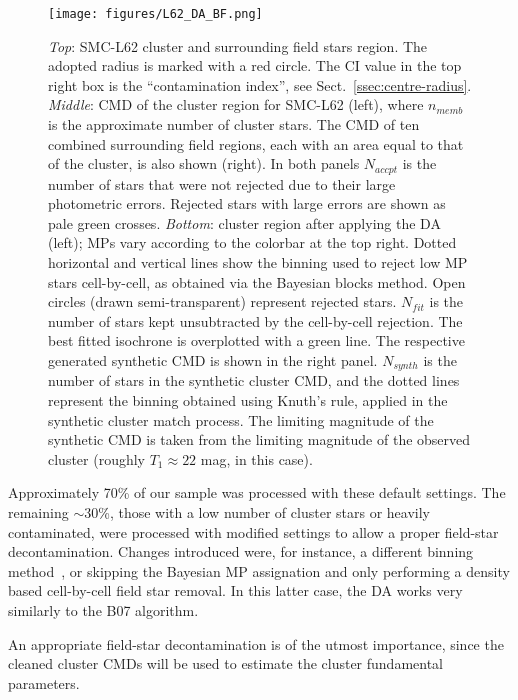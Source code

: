 \documentclass{aa}
\begin{document}
\begin{figure}
\centering
\texttt{[image: figures/L62\_DA\_BF.png]}
\caption{\emph{Top}: SMC-L62 cluster and surrounding field stars
region. The adopted radius is marked with a red circle. The CI value in the top
right box is the ``contamination index'', see Sect.~\ref{ssec:centre-radius}.
%
\emph{Middle}: CMD of the cluster region for SMC-L62 (left),
where $n_{memb}$ is the approximate number of cluster stars. The CMD
of ten combined surrounding field regions, each with an area equal to
that of the cluster, is also shown (right).
In both panels $N_{accpt}$ is the number of stars that were not rejected due to
their large photometric errors. Rejected stars with large errors are shown as
pale green crosses.
%
\emph{Bottom}: cluster region after applying the DA (left); MPs vary
according to the colorbar at the top right. Dotted horizontal and vertical lines
show the binning used to reject low MP stars cell-by-cell, as obtained via the
Bayesian blocks method. Open circles (drawn semi-transparent) represent rejected
stars.
$N_{fit}$ is the number of stars kept unsubtracted by the cell-by-cell
rejection. The best fitted isochrone is overplotted with a green line. 
The respective generated synthetic CMD is shown in the right panel. $N_{synth}$
is the number of stars in the synthetic cluster CMD, and the dotted lines
represent the binning obtained using Knuth's rule, applied in the synthetic
cluster match process. The limiting magnitude of the synthetic CMD is
taken from the limiting magnitude of the observed cluster (roughly
$T_1{\approx}22$ mag, in this case).}
\label{fig:DA_BF}
\end{figure}

Approximately 70\% of our sample was processed with these default settings.
%
The remaining ${\sim}$30\%, those with a low number of cluster stars
or heavily contaminated, were processed with modified settings to allow a proper
field-star decontamination.
Changes introduced were, for instance, a different binning
method~\citep[often a rectangular grid using Scott's rule,][]{Scott_1979},
or skipping the Bayesian MP assignation and only performing a density based
cell-by-cell field star removal. In this latter case, the DA works very
similarly to the B07 algorithm.

An appropriate field-star decontamination is of the utmost importance, since the
cleaned cluster CMDs will be used to estimate the cluster fundamental parameters.
\end{document}
